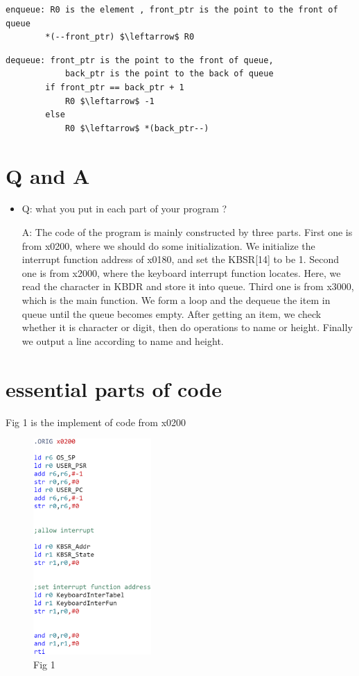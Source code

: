 \documentclass[twoside]{article}
\begin{document}
\begin{CJK*}{UTF8}{gbsn}
	\begin{lstlisting}[mathescape=true]
		enqueue: R0 is the element , front_ptr is the point to the front of queue
		*(--front_ptr) $\leftarrow$ R0
	\end{lstlisting}


	\begin{lstlisting}[mathescape=true]
		dequeue: front_ptr is the point to the front of queue,
			back_ptr is the point to the back of queue
		if front_ptr == back_ptr + 1
			R0 $\leftarrow$ -1
		else 
			R0 $\leftarrow$ *(back_ptr--)
	\end{lstlisting}


	\section{Q and A}
	\begin{itemize}
		\item 	Q: what you put in each part of your program ?
		
				A: The code of the program is mainly constructed by three parts. First one is from x0200, where we should do some initialization. We initialize the interrupt function address of x0180, and set the KBSR[14] to be 1. Second one is from x2000, where the keyboard interrupt function locates. Here, we read the character in KBDR and store it into queue. Third one is from x3000, which is the main function. We form a loop and the dequeue the item in queue until the queue becomes empty. After getting an item, we check whether it is character or digit, then do operations to name or height. Finally we output a line according to name and height.
	\end{itemize}


	\section{essential parts of code}
	Fig 1 is the implement of code from x0200
	\begin{figure}[htbp]
		\small
		\centering
		\includegraphics[width=0.4\textwidth]{fig1.eps}
		\caption{Fig 1} %
	\end{figure}



\end{CJK*}
\end{document}
